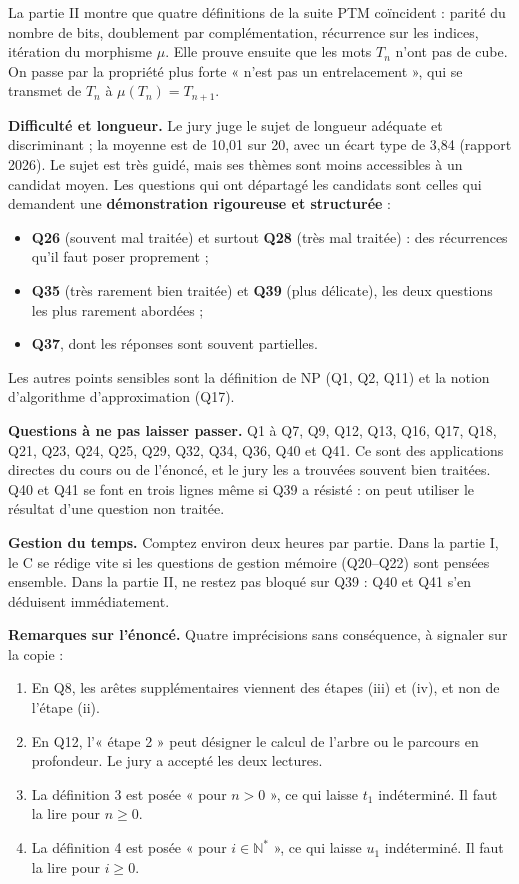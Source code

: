 \documentclass[11pt,a4paper]{article}
\providecommand{\tightlist}{\setlength{\itemsep}{0pt}\setlength{\parskip}{0pt}}
\begin{document}
La partie II montre que quatre définitions de la suite PTM coïncident : parité du nombre de bits, doublement par complémentation, récurrence sur les indices, itération du morphisme \(\mu\). Elle prouve ensuite que les mots \(T_n\) n'ont pas de cube. On passe par la propriété plus forte « n'est pas un entrelacement », qui se transmet de \(T_n\) à \(\mu(T_n)=T_{n+1}\).

\textbf{Difficulté et longueur.} Le jury juge le sujet de longueur adéquate et discriminant ; la moyenne est de 10,01 sur 20, avec un écart type de 3,84 (rapport 2026). Le sujet est très guidé, mais ses thèmes sont moins accessibles à un candidat moyen. Les questions qui ont départagé les candidats sont celles qui demandent une \textbf{démonstration rigoureuse et structurée} :

\begin{itemize}
\tightlist
\item
  \textbf{Q26} (souvent mal traitée) et surtout \textbf{Q28} (très mal traitée) : des récurrences qu'il faut poser proprement ;
\item
  \textbf{Q35} (très rarement bien traitée) et \textbf{Q39} (plus délicate), les deux questions les plus rarement abordées ;
\item
  \textbf{Q37}, dont les réponses sont souvent partielles.
\end{itemize}

Les autres points sensibles sont la définition de NP (Q1, Q2, Q11) et la notion d'algorithme d'approximation (Q17).

\textbf{Questions à ne pas laisser passer.} Q1 à Q7, Q9, Q12, Q13, Q16, Q17, Q18, Q21, Q23, Q24, Q25, Q29, Q32, Q34, Q36, Q40 et Q41. Ce sont des applications directes du cours ou de l'énoncé, et le jury les a trouvées souvent bien traitées. Q40 et Q41 se font en trois lignes même si Q39 a résisté : on peut utiliser le résultat d'une question non traitée.

\textbf{Gestion du temps.} Comptez environ deux heures par partie. Dans la partie I, le C se rédige vite si les questions de gestion mémoire (Q20--Q22) sont pensées ensemble. Dans la partie II, ne restez pas bloqué sur Q39 : Q40 et Q41 s'en déduisent immédiatement.

\textbf{Remarques sur l'énoncé.} Quatre imprécisions sans conséquence, à signaler sur la copie :

\begin{enumerate}
\def\labelenumi{\arabic{enumi}.}
\tightlist
\item
  En Q8, les arêtes supplémentaires viennent des étapes (iii) et (iv), et non de l'étape (ii).
\item
  En Q12, l'« étape 2 » peut désigner le calcul de l'arbre ou le parcours en profondeur. Le jury a accepté les deux lectures.
\item
  La définition 3 est posée « pour \(n>0\) », ce qui laisse \(t_1\) indéterminé. Il faut la lire pour \(n\ge 0\).
\item
  La définition 4 est posée « pour \(i\in\mathbb N^\ast\) », ce qui laisse \(u_1\) indéterminé. Il faut la lire pour \(i\ge 0\).
\end{enumerate}
\end{document}
